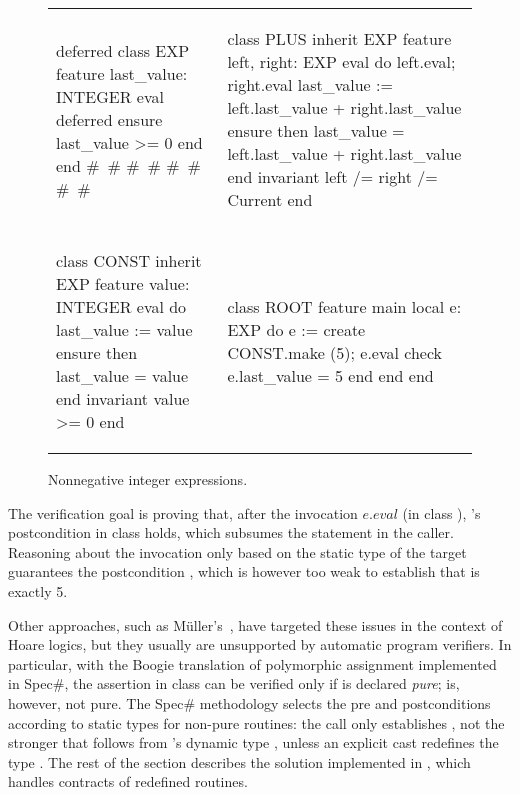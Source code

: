 \begin{figure}[!ht]
\begin{tabular}{ll}

{\begin{erunning}
deferred class EXP
feature
	last_value: INTEGER
	eval
		deferred
		ensure
			last_value >= 0
		end
end
 #\ # 
 #\ # 
 #\ # 
 #\ # 
\end{erunning}}
&
\hspace{5mm}
{\begin{erunning}
class PLUS inherit EXP feature 
	left, right: EXP
	eval do
			left.eval; right.eval
			last_value := left.last_value + 
						  right.last_value
		ensure then
			last_value = left.last_value + 
						 right.last_value
		end
invariant
	left /= right /= Current
end
\end{erunning}}
\vspace{5mm}
\\
{\begin{erunning}
class CONST inherit EXP
feature 
	value: INTEGER
	eval do
			last_value := value
		ensure then
			last_value = value
		end
invariant
	value >= 0
end
\end{erunning}}
&
\hspace{5mm}
{\begin{erunning}
class ROOT
feature    
	main
		local
				e: EXP
		do
			e := create {CONST}.make (5);
			e.eval
			check e.last_value = 5 end    
		end
end 
\end{erunning}}

\\

\end{tabular}
\caption{Nonnegative integer expressions.}\label{example-exp}
\end{figure}

The verification goal is proving that, after the invocation $e.eval$ (in class ), 's postcondition in class  holds, which subsumes the  statement in the caller.
Reasoning about the invocation only based on the static type  of the target  guarantees the postcondition , which is however too weak to establish that  is exactly 5.

Other approaches, such as M\"uller's~\cite{MUELLER02}, have targeted these issues in the context of Hoare logics, but they usually are unsupported by automatic program verifiers.
In particular, with the Boogie translation of polymorphic assignment implemented in Spec\#, the assertion  in class  can be verified only if  is declared \emph{pure};  is, however, not pure.
The Spec\# methodology selects the pre and postconditions according to static types for non-pure routines: the call  only establishes , not the stronger  that follows from 's dynamic type , unless an explicit cast redefines the type .
The rest of the section describes the solution implemented in \AutoProof, which handles contracts of redefined routines.




